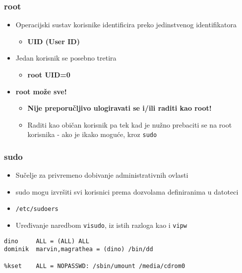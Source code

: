 \documentclass[table,usenames,dvipsnames] {beamer}
\newcommand{\shell}[1]{\texttt{#1}}
\begin{document}
\begin{frame}[t]
\frametitle{root} 
\begin{itemize}
  \item Operacijski sustav korisnike identificira preko jedinstvenog identifikatora
  \begin{itemize}
	  \item[] \textbf{UID (User ID)}
  \end{itemize}
\end{itemize}
\begin{itemize}
  \item Jedan korisnik se posebno tretira 
  \begin{itemize}
    \item[] \bf{root} \hspace{2em} UID=0
  \end{itemize}
\end{itemize}
\begin{itemize}
  \item \textbf{root može sve!}
  \begin{itemize}
    \item \textbf{Nije preporučljivo ulogiravati se i/ili raditi kao root!}
    \item Raditi kao običan korisnik pa tek kad je nužno prebaciti se na 
          root korisnika - ako je ikako moguće, kroz \shell{sudo}
  \end{itemize}
\end{itemize}
\end{frame}

\begin{frame}[fragile]
\frametitle{sudo}
\begin{itemize}
  \item Sučelje za privremeno dobivanje administrativnih ovlasti
  \item sudo mogu izvršiti svi korisnici prema dozvolama definiranima u datoteci
  \item[] {\small\shell{/etc/sudoers}}
  \item Uređivanje naredbom \shell{visudo}, iz istih razloga kao i \shell{vipw}
\end{itemize}
\vfill
\footnotesize
\begin{Verbatim}
dino     ALL = (ALL) ALL
dominik  marvin,magrathea = (dino) /bin/dd

%kset    ALL = NOPASSWD: /sbin/umount /media/cdrom0
\end{Verbatim}
\end{frame}
\end{document}
